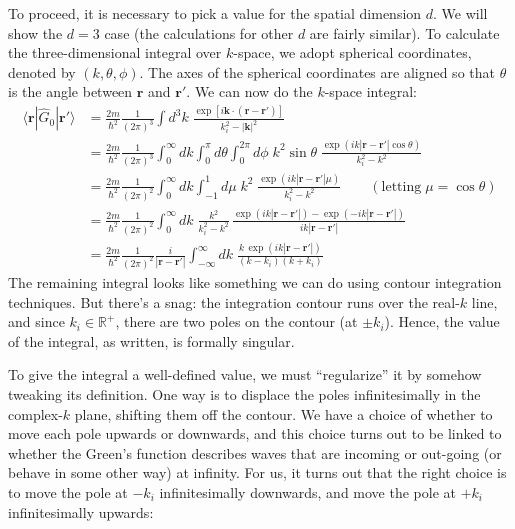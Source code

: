 \documentclass[pra,12pt]{revtex4}
\begin{document}
To proceed, it is necessary to pick a value for the spatial dimension $d$.  We
will show the $d = 3$ case (the calculations for other $d$ are fairly
similar).  To calculate the three-dimensional integral over $k$-space,
we adopt spherical coordinates, denoted by $(k,\theta,\phi)$.  The
axes of the spherical coordinates are aligned so that $\theta$ is the
angle between $\mathbf{r}$ and $\mathbf{r}'$.  We can now do the $k$-space
integral:
$$\begin{aligned}\langle\mathbf{r}|\hat{G}_0|\mathbf{r}'\rangle &= \frac{2m}{\hbar^2} \frac{1}{(2\pi)^3} \int d^3k \; \frac{\exp\left[i\mathbf{k}\cdot (\mathbf{r}-\mathbf{r}')\right]}{k_i^2-|\mathbf{k}|^2} \\ &= \frac{2m}{\hbar^2} \frac{1}{(2\pi)^3} \int_0^\infty dk \int_0^\pi d\theta \int_{0}^{2\pi} d\phi \;k^2\sin\theta\; \frac{\displaystyle \exp\left(ik|\mathbf{r}-\mathbf{r}'|\cos\theta\right)}{k_i^2-k^2} \\ &= \frac{2m}{\hbar^2} \frac{1}{(2\pi)^2} \int_0^\infty dk \int_{-1}^1 d\mu \;k^2\; \frac{\displaystyle \exp\left(ik|\mathbf{r}-\mathbf{r}'|\mu\right)}{k_i^2-k^2} \qquad(\text{letting}\;\mu = \cos\theta) \\ &= \frac{2m}{\hbar^2} \frac{1}{(2\pi)^2} \int_0^\infty dk \; \frac{ k^2}{k_i^2-k^2}\, \frac{\displaystyle \exp\left(ik|\mathbf{r}-\mathbf{r}'|\right) - \exp\left(-ik|\mathbf{r}-\mathbf{r}'|\right)}{ik|\mathbf{r}-\mathbf{r}'|} \\ &= \frac{2m}{\hbar^2} \frac{1}{(2\pi)^2} \frac{i}{|\mathbf{r}-\mathbf{r}'|} \int_{-\infty}^\infty dk \; \frac{\displaystyle k\, \exp\left(ik|\mathbf{r}-\mathbf{r}'|\right)}{(k - k_i)(k+k_i)}\end{aligned}$$
The remaining integral looks like something we can do using contour
integration techniques.  But there's a snag: the integration contour
runs over the real-$k$ line, and since $k_i \in \mathbb{R}^+$, there
are two poles on the contour (at $\pm k_i$).  Hence, the value of the
integral, as written, is formally singular.

To give the integral a well-defined value, we must ``regularize'' it
by somehow tweaking its definition.  One way is to displace the poles
infinitesimally in the complex-$k$ plane, shifting them off the
contour.  We have a choice of whether to move each pole upwards or
downwards, and this choice turns out to be linked to whether the
Green's function describes waves that are incoming or out-going (or
behave in some other way) at infinity.  For us, it turns out that the
right choice is to move the pole at $-k_i$ infinitesimally downwards,
and move the pole at $+k_i$ infinitesimally upwards:
\end{document}
